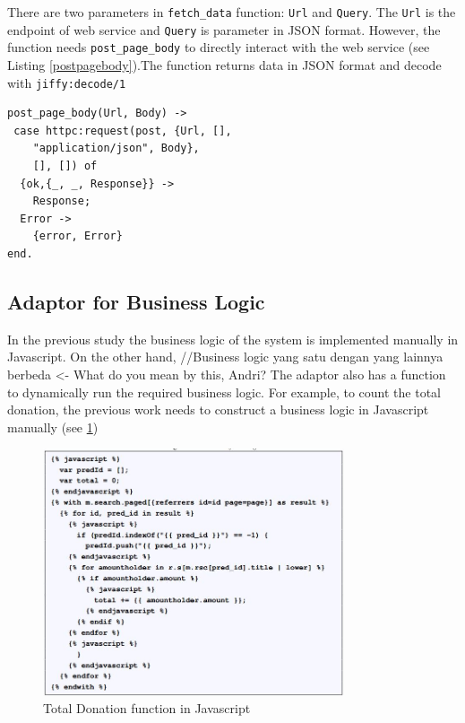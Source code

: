 \documentclass[conference]{IEEEtran}
\begin{document}

There are two parameters in \texttt{fetch\_data} function: \texttt{Url} and \texttt{Query}. The \texttt{Url} is the endpoint of web service and \texttt{Query} is parameter in JSON format. However, the function needs \texttt{post\_page\_body} to directly interact with the web service (see Listing \ref{postpagebody}).The function returns data in JSON format and decode with \texttt{jiffy:decode/1} 

\begin{lstlisting}[caption=Implementation of post\_page\_body function, label=postpagebody]
post_page_body(Url, Body) ->
 case httpc:request(post, {Url, [], 
    "application/json", Body},
    [], []) of
  {ok,{_, _, Response}} ->
    Response;
  Error ->
    {error, Error}
end.
\end{lstlisting} 

\subsection{Adaptor for Business Logic}
In the previous study \cite{bravyto} the business logic of the system is implemented manually in Javascript. On the other hand, //Business logic yang satu dengan yang lainnya berbeda <- What do you mean by this, Andri? The adaptor also has a function to dynamically run the required business logic. For example, to count the total donation, the previous work \cite{bravyto} needs to construct a business logic in Javascript manually (see \ref{samplejs})

\begin{figure}[h]
\centering
\includegraphics[width=3.5in]{totaldonationjs}

\caption{Total Donation function in Javascript}
\label{samplejs}
\end{figure}
\end{document}
